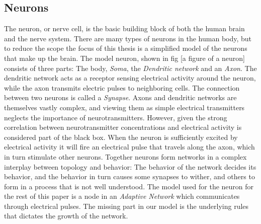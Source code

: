 
\subsection{Neurons}
The neuron, or nerve cell, is the basic building block of both the human brain
and the nerve system.
There are many types of neurons in the human body, but to reduce the scope the
focus of this thesis is a simplified model of the neurons that make up the
brain.
The model neuron, shown in fig [a figure of a neuron] consists of three parts:
The body, \emph{Soma}, the \emph{Dendritic network} and an \emph{Axon}.
The dendritic network acts as a receptor sensing electrical activity around the
neuron, while the axon transmits electric pulses to neighboring cells.
The connection between two neurons is called a \emph{Synapse}.
Axons and dendritic networks are themselves vastly complex, and viewing them as
simple electrical transmitters neglects the importance of neurotransmitters.
However, given the strong correlation between neurotransmitter concentrations and
electrical activity is considered part of the black box.
When the neuron is sufficiently excited by electrical activity it will fire an
electrical pulse that travels along the axon, which in turn stimulate other
neurons.
Together neurons form networks in a complex interplay between topology and behavior:
The behavior of the network decides its behavior, and the behavior in turn
causes some synapses to wither, and others to form in a process that is not well
understood.
The model used for the neuron for the rest of this paper is a node in an
\emph{Adaptive Network} which communicates through electrical pulses.
The missing part in our model is the underlying rules that dictates the growth
of the network.
